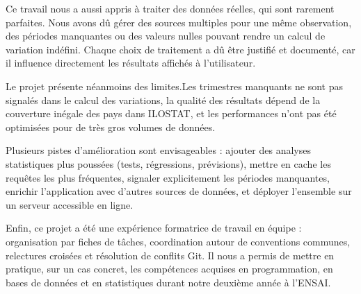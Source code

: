 \documentclass[
  french,
  12pt,
  letterpaper,
  DIV=11,
  numbers=noendperiod]{scrartcl}
\begin{document}
Ce travail nous a aussi appris à traiter des données réelles, qui sont
rarement parfaites. Nous avons dû gérer des sources multiples pour une
même observation, des périodes manquantes ou des valeurs nulles pouvant
rendre un calcul de variation indéfini. Chaque choix de traitement a dû
être justifié et documenté, car il influence directement les résultats
affichés à l'utilisateur.

Le projet présente néanmoins des limites.Les trimestres manquants ne
sont pas signalés dans le calcul des variations, la qualité des
résultats dépend de la couverture inégale des pays dans ILOSTAT, et les
performances n'ont pas été optimisées pour de très gros volumes de
données.

Plusieurs pistes d'amélioration sont envisageables : ajouter des
analyses statistiques plus poussées (tests, régressions, prévisions),
mettre en cache les requêtes les plus fréquentes, signaler explicitement
les périodes manquantes, enrichir l'application avec d'autres sources de
données, et déployer l'ensemble sur un serveur accessible en ligne.

Enfin, ce projet a été une expérience formatrice de travail en équipe :
organisation par fiches de tâches, coordination autour de conventions
communes, relectures croisées et résolution de conflits Git. Il nous a
permis de mettre en pratique, sur un cas concret, les compétences
acquises en programmation, en bases de données et en statistiques durant
notre deuxième année à l'ENSAI.
\end{document}
